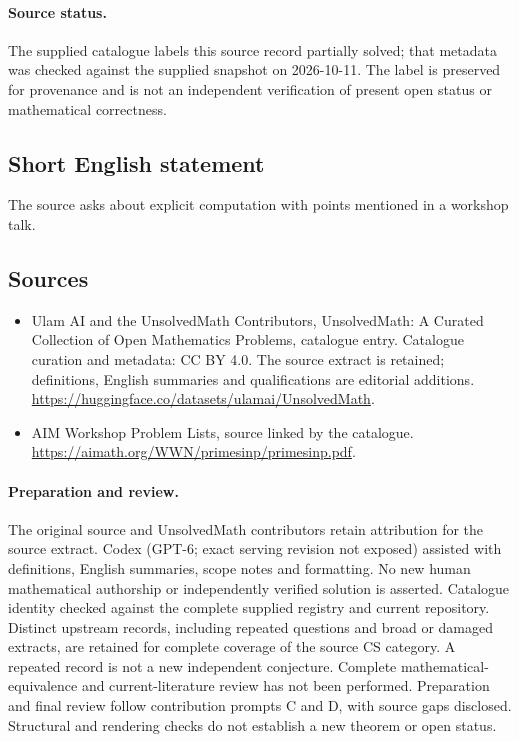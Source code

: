 \documentclass[11pt]{article}
\begin{document}
\paragraph{Source status.}
The supplied catalogue labels this source record partially solved; that metadata was checked against the supplied snapshot on 2026-10-11. The label is preserved for provenance and is not an independent verification of present open status or mathematical correctness.
\subsection{Short English statement}
The source asks about explicit computation with points mentioned in a workshop talk.
\subsection{Sources}
\begin{itemize}
\item[\hypertarget{source:statement:1}{S1}] Ulam AI and the UnsolvedMath Contributors, UnsolvedMath: A Curated Collection of Open Mathematics Problems, catalogue entry. Catalogue curation and metadata: CC BY 4.0. The source extract is retained; definitions, English summaries and qualifications are editorial additions.
\url{https://huggingface.co/datasets/ulamai/UnsolvedMath}.
\item[\hypertarget{source:statement:2}{S2}] AIM Workshop Problem Lists, source linked by the catalogue.
\url{https://aimath.org/WWN/primesinp/primesinp.pdf}.
\end{itemize}
\paragraph{Preparation and review.}
The original source and UnsolvedMath contributors retain attribution for the source extract. Codex (GPT-6; exact serving revision not exposed) assisted with definitions, English summaries, scope notes and formatting. No new human mathematical authorship or independently verified solution is asserted. Catalogue identity checked against the complete supplied registry and current repository. Distinct upstream records, including repeated questions and broad or damaged extracts, are retained for complete coverage of the source CS category. A repeated record is not a new independent conjecture. Complete mathematical-equivalence and current-literature review has not been performed. Preparation and final review follow contribution prompts C and D, with source gaps disclosed. Structural and rendering checks do not establish a new theorem or open status.
\label{end:statement}
\end{document}
